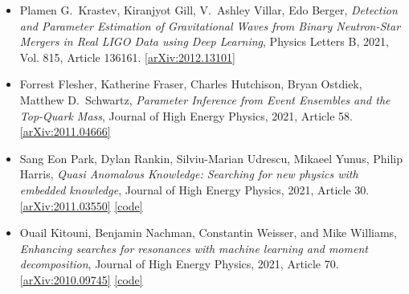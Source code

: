 \begin{itemize}
\item Plamen G.\  Krastev, Kiranjyot Gill, V.\  Ashley Villar, Edo Berger, \textit{Detection and Parameter Estimation of Gravitational Waves from Binary Neutron-Star Mergers in Real LIGO Data using Deep Learning}, Physics Letters B, 2021, Vol. 815, Article 136161. \href{https://arxiv.org/abs/2012.13101}{[arXiv:2012.13101]} 
\item Forrest Flesher, Katherine Fraser, Charles Hutchison, Bryan Ostdiek, Matthew D.\  Schwartz, \textit{Parameter Inference from Event Ensembles and the Top-Quark Mass}, Journal of High Energy Physics, 2021, Article 58. \href{https://arxiv.org/abs/2011.04666}{[arXiv:2011.04666]} 
\item Sang Eon Park, Dylan Rankin, Silviu-Marian Udrescu, Mikaeel Yunus, Philip Harris, \textit{Quasi Anomalous Knowledge: Searching for new physics with embedded knowledge}, Journal of High Energy Physics, 2021, Article 30. \href{https://arxiv.org/abs/2011.03550}{[arXiv:2011.03550]}  \href{https://github.com/SangeonPark/QUAK}{[code]} 
\item Ouail Kitouni, Benjamin Nachman, Constantin Weisser, and Mike Williams, \textit{Enhancing searches for resonances with machine learning and moment decomposition}, Journal of High Energy Physics, 2021, Article 70. \href{https://arxiv.org/abs/2010.09745}{[arXiv:2010.09745]}  \href{https://github.com/okitouni/MoDe}{[code]} 
\end{itemize}